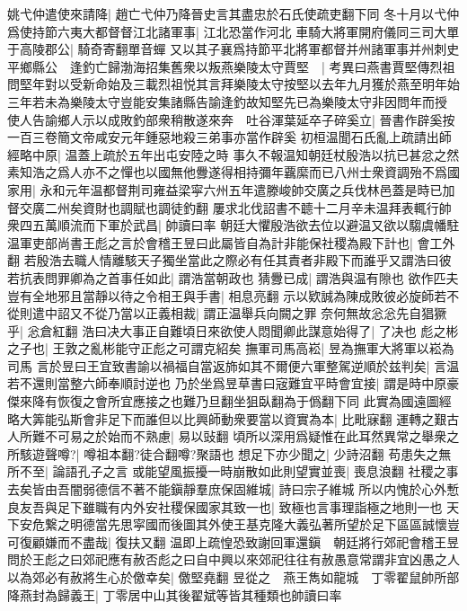 姚弋仲遣使來請降|{
	趙亡弋仲乃降晉史言其盡忠於石氏使疏吏翻下同}
冬十月以弋仲爲使持節六夷大都督督江北諸軍事|{
	江北恐當作河北}
車騎大將軍開府儀同三司大單于高陵郡公|{
	騎奇寄翻單音蟬}
又以其子襄爲持節平北將軍都督并州諸軍事并州刺史平鄉縣公　逢釣亡歸渤海招集舊衆以叛燕樂陵太守賈堅　|{
	考異曰燕書賈堅傳烈祖問堅年對以受新命始及三載烈祖悦其言拜樂陵太守按堅以去年九月獲於燕至明年始三年若未為樂陵太守豈能安集諸縣告諭逢釣故知堅先已為樂陵太守非因問年而授}
使人告諭鄉人示以成敗釣部衆稍散遂來奔　吐谷渾葉延卒子碎奚立|{
	晉書作辟奚按一百三卷簡文帝咸安元年鍾惡地殺三弟事亦當作辟奚}
初桓温聞石氏亂上疏請出師經略中原|{
	温蓋上疏於五年出屯安陸之時}
事久不報温知朝廷杖殷浩以抗已甚忿之然素知浩之爲人亦不之憚也以國無他釁遂得相持彌年覊縻而已八州士衆資調殆不爲國家用|{
	永和元年温都督荆司雍益梁寜六州五年遣滕峻帥交廣之兵伐林邑蓋是時已加督交廣二州矣資財也調賦也調徒釣翻}
屢求北伐詔書不聼十二月辛未温拜表輒行帥衆四五萬順流而下軍於武昌|{
	帥讀曰率}
朝廷大懼殷浩欲去位以避温又欲以騶虞幡駐温軍吏部尚書王彪之言於會稽王昱曰此屬皆自為計非能保社稷為殿下計也|{
	會工外翻}
若殷浩去職人情離駭天子獨坐當此之際必有任其責者非殿下而誰乎又謂浩曰彼若抗表問罪卿為之首事任如此|{
	謂浩當朝政也}
猜釁已成|{
	謂浩與温有隙也}
欲作匹夫豈有全地邪且當靜以待之令相王與手書|{
	相息亮翻}
示以欵誠為陳成敗彼必旋師若不從則遣中詔又不從乃當以正義相裁|{
	謂正温舉兵向闕之罪}
奈何無故忩忩先自猖獗乎|{
	忩倉紅翻}
浩曰决大事正自難頃日來欲使人悶聞卿此謀意始得了|{
	了决也}
彪之彬之子也|{
	王敦之亂彬能守正彪之可謂克紹矣}
撫軍司馬高崧|{
	昱為撫軍大將軍以崧為司馬}
言於昱曰王宜致書諭以禍福自當返斾如其不爾便六軍整駕逆順於兹判矣|{
	言温若不還則當整六師奉順討逆也}
乃於坐爲昱草書曰宼難宜平時會宜接|{
	謂是時中原豪傑來降有恢復之會所宜應接之也難乃旦翻坐狙臥翻為于僞翻下同}
此實為國遠圖經略大筭能弘斯會非足下而誰但以比興師動衆要當以資實為本|{
	比毗寐翻}
運轉之艱古人所難不可易之於始而不熟慮|{
	易以䜴翻}
頃所以深用爲疑惟在此耳然異常之舉衆之所駭遊聲噂?|{
	噂祖本翻?徒合翻噂?聚語也}
想足下亦少聞之|{
	少詩沼翻}
苟患失之無所不至|{
	論語孔子之言}
或能望風振擾一時崩散如此則望實並喪|{
	喪息浪翻}
社稷之事去矣皆由吾闇弱德信不著不能鎭靜羣庶保固維城|{
	詩曰宗子維城}
所以内愧於心外慙良友吾與足下雖職有内外安社稷保國家其致一也|{
	致極也言事理詣極之地則一也}
天下安危繋之明德當先思寜國而後圖其外使王基克隆大義弘著所望於足下區區誠懷豈可復顧嫌而不盡哉|{
	復扶又翻}
温即上疏惶恐致謝回軍還鎭　朝廷將行郊祀會稽王昱問於王彪之曰郊祀應有赦否彪之曰自中興以來郊祀往往有赦愚意常謂非宜凶愚之人以為郊必有赦將生心於儌幸矣|{
	儌堅堯翻}
昱從之　燕王雋如龍城　丁零翟鼠帥所部降燕封為歸義王|{
	丁零居中山其後翟斌等皆其種類也帥讀曰率}


